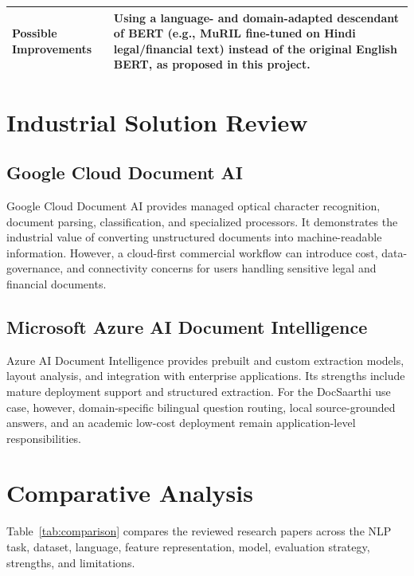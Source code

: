 \begin{longtable}{|p{5cm}|p{10cm}|}
Possible Improvements &
Using a language- and domain-adapted descendant of BERT (e.g., MuRIL fine-tuned on Hindi legal/financial text) instead of the original English BERT, as proposed in this project.
\\ \hline

\end{longtable}

\section{Industrial Solution Review}

\subsection{Google Cloud Document AI}
Google Cloud Document AI provides managed optical character recognition, document parsing, classification, and specialized processors. It demonstrates the industrial value of converting unstructured documents into machine-readable information. However, a cloud-first commercial workflow can introduce cost, data-governance, and connectivity concerns for users handling sensitive legal and financial documents.

\subsection{Microsoft Azure AI Document Intelligence}
Azure AI Document Intelligence provides prebuilt and custom extraction models, layout analysis, and integration with enterprise applications. Its strengths include mature deployment support and structured extraction. For the DocSaarthi use case, however, domain-specific bilingual question routing, local source-grounded answers, and an academic low-cost deployment remain application-level responsibilities.

\section{Comparative Analysis}

Table~\ref{tab:comparison} compares the reviewed research papers across the NLP task, dataset, language, feature representation, model, evaluation strategy, strengths, and limitations.


